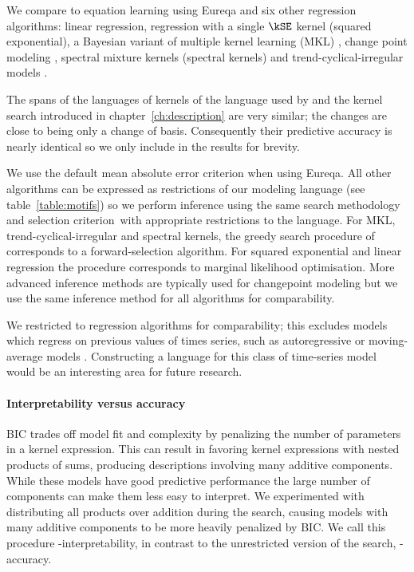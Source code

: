 We compare \procedurename{} to equation learning using Eureqa \citep{Eureqa} and six other regression algorithms: linear regression, \gp{} regression with a single $\kSE$ kernel (squared exponential), a Bayesian variant of multiple kernel learning (MKL) \citep[e.g.][]{bach2004multiple}, change point modeling \citep[e.g.][]{garnett2010sequential, saatcci2010gaussian, FoxDunson:NIPS2012}, spectral mixture kernels \citep{WilAda13} (spectral kernels) and trend-cyclical-irregular models \citep[e.g.][]{lind2006basic}.

The spans of the languages of kernels of the language used by \procedurename{} and the kernel search introduced in chapter~\ref{ch:description} are very similar; the changes are close to being only a change of basis.
Consequently their predictive accuracy is nearly identical so we only include \procedurename{} in the results for brevity.

We use the default mean absolute error criterion when using Eureqa.
All other algorithms can be expressed as restrictions of our modeling language (see table~\ref{table:motifs}) so we perform inference using the same search methodology and selection criterion\footnotemark~with appropriate restrictions to the language.
For MKL, trend-cyclical-irregular and spectral kernels, the greedy search procedure of \procedurename{} corresponds to a forward-selection algorithm.
For squared exponential and linear regression the procedure corresponds to marginal likelihood optimisation.
More advanced inference methods are typically used for changepoint modeling but we use the same inference method for all algorithms for comparability.

We restricted to regression algorithms for comparability; this excludes models which regress on previous values of times series, such as autoregressive or moving-average models \citep[e.g.][]{box2013time}.
Constructing a language for this class of time-series model would be an interesting area for future research.

\paragraph{Interpretability versus accuracy}

BIC trades off model fit and complexity by penalizing the number of parameters in a kernel expression.
This can result in \procedurename{} favoring kernel expressions with nested products of sums, producing descriptions involving many additive components.
While these models have good predictive performance the large number of components can make them less easy to interpret.
We experimented with distributing all products over addition during the search, causing models with many additive components to be more heavily penalized by BIC.
We call this procedure \procedurename{}-interpretability, in contrast to the unrestricted version of the search, \procedurename{}-accuracy.

